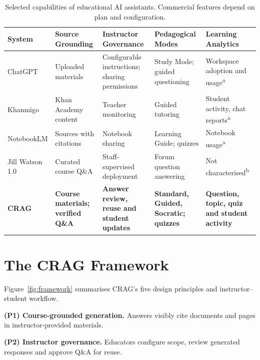 \documentclass[conference]{IEEEtran}
\begin{document}
\begin{table}[t]
\centering
\caption{Selected capabilities of educational AI assistants.
Commercial features depend on plan and configuration.}
\label{tab:litcompare}
\footnotesize
\setlength{\tabcolsep}{4pt}
\renewcommand{\arraystretch}{1.15}
\begin{tabular}{@{}
p{2.3cm}
p{3.1cm}
p{3.5cm}
p{3.0cm}
p{3.2cm}
@{}}
\toprule
\textbf{System} &
\textbf{Source Grounding} &
\textbf{Instructor Governance} &
\textbf{Pedagogical Modes} &
\textbf{Learning Analytics} \\
\midrule

ChatGPT &
Uploaded materials &
Configurable instructions; sharing permissions &
Study Mode; guided questioning &
Workspace adoption and usage\textsuperscript{a} \\

Khanmigo &
Khan Academy content &
Teacher monitoring &
Guided tutoring &
Student activity, chat reports\textsuperscript{a} \\

NotebookLM &
Sources with citations &
Notebook sharing &
Learning Guide; quizzes &
Notebook usage\textsuperscript{a} \\

Jill Watson 1.0~\cite{b_jillwatson} &
Curated course Q\&A &
Staff-supervised deployment &
Forum question answering &
Not characterised\textsuperscript{b} \\

\textbf{CRAG} &
\textbf{Course materials; verified Q\&A} &
\textbf{Answer review, reuse and student updates} &
\textbf{Standard, Guided, Socratic; quizzes} &
\textbf{Question, topic, quiz and student activity} \\

\bottomrule
\end{tabular}
\end{table}

\section{The CRAG Framework}

Figure~\ref{fig:framework} summarises CRAG's five design principles and instructor--student workflow.

\textbf{(P1) Course-grounded generation.} Answers visibly cite documents and pages in instructor-provided materials.

\textbf{(P2) Instructor governance.} Educators configure scope, review generated responses and approve Q\&A for reuse.
\end{document}
